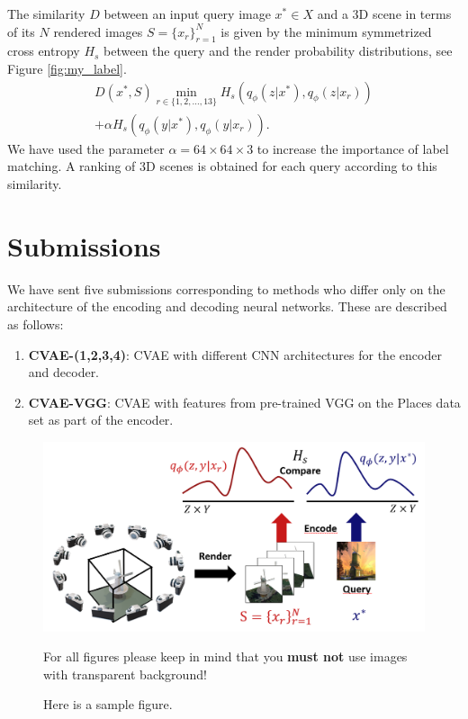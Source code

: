 The similarity $D$ between an input query image $x^*\in X$ and a 3D scene in terms of its $N$ rendered images $S = \{x_r\}_{r=1}^{N}$ is given by the minimum symmetrized cross entropy $H_s$ between the query and the render probability distributions, see Figure \ref{fig:my_label}.
\begin{multline}
 D(x^*, S)\min_{r\in\{1,2,\ldots,13\} }H_s(q_\phi(z|x^*),q_\phi(z|x_{r}))\\
+\alpha H_s(q_\phi(y|x^*),q_\phi(y|x_{r})).
\end{multline}
We have used the parameter $\alpha = 64\times 64 \times 3$ to increase the importance of label matching. A ranking of 3D scenes is obtained for each query according to this similarity.
\section{Submissions}
We have sent five submissions corresponding to methods who differ only on the architecture of the encoding and decoding neural networks. These are described as follows:
\begin{enumerate}
    \item \textbf{CVAE-(1,2,3,4)}: CVAE with different CNN architectures for the encoder and decoder.
    \item \textbf{CVAE-VGG}: CVAE with features from pre-trained VGG \cite{gkallia2017keras_places365} on the Places data set \cite{Zhou2018} as part of the encoder.
    
\end{enumerate}

\begin{figure}[htb]
  \centering

  \includegraphics[width=.8\linewidth]{comparison2.png}
  \parbox[t]{.9\columnwidth}{\relax
           For all figures please keep in mind that you \textbf{must not}
           use images with transparent background! 
           }
  \caption{\label{fig:firstExample}
           Here is a sample figure.}
\end{figure}











%




\newpage


